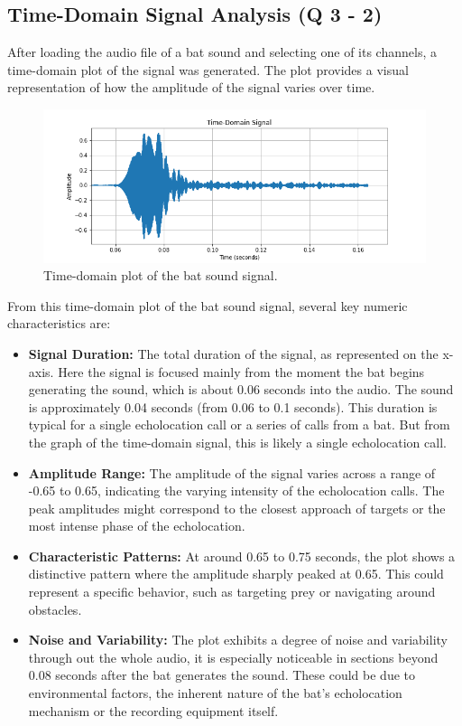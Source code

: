 \documentclass[12pt]{article}
\begin{document}
\subsection{Time-Domain Signal Analysis (Q 3 - 2)}
After loading the audio file of a bat sound and selecting one of its channels, a time-domain plot of the signal was generated. The plot provides a visual representation of how the amplitude of the signal varies over time.

\begin{figure}[h]
\centering
\includegraphics[width=1.0\textwidth]{time_domain_signal_plot.png}
\caption{Time-domain plot of the bat sound signal.}
\end{figure}

From this time-domain plot of the bat sound signal, several key numeric characteristics are:

\begin{itemize}
    \item \textbf{Signal Duration:} The total duration of the signal, as represented on the x-axis. Here the signal is focused mainly from the moment the bat begins generating the sound, which is about 0.06 seconds into the audio. The sound is approximately 0.04 seconds (from 0.06 to 0.1 seconds). This duration is typical for a single echolocation call or a series of calls from a bat. But from the graph of the time-domain signal, this is likely a single echolocation call.
    
    \item \textbf{Amplitude Range:} The amplitude of the signal varies across a range of -0.65 to 0.65, indicating the varying intensity of the echolocation calls. The peak amplitudes might correspond to the closest approach of targets or the most intense phase of the echolocation.
    
    \item \textbf{Characteristic Patterns:} At around 0.65 to 0.75 seconds, the plot shows a distinctive pattern where the amplitude sharply peaked at 0.65. This could represent a specific behavior, such as targeting prey or navigating around obstacles.
    
    \item \textbf{Noise and Variability:} The plot exhibits a degree of noise and variability through out the whole audio, it is especially noticeable in sections beyond 0.08 seconds after the bat generates the sound. These could be due to environmental factors, the inherent nature of the bat's echolocation mechanism or the recording equipment itself.

\end{itemize}
\end{document}
